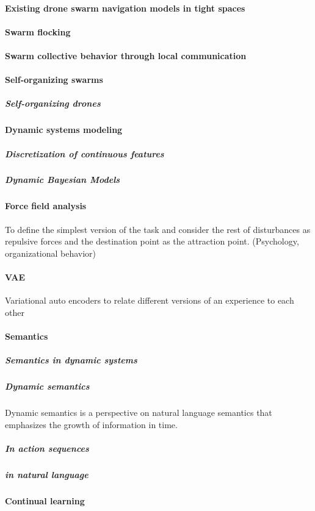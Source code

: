 \documentclass{article}
\begin{document}
		\paragraph{Existing drone swarm navigation models in tight spaces}
			\cite{soria-2020-swarmlab-a-matlab-drone-swarm-simulator}
		\paragraph{Swarm flocking}
			\cite{vasarhelyi-2014-outdoor-flocking-and-formation-flight-with-autonomous-aerial-robots}
			\cite{reynolds-1987-flocks-herds-and-schools-a-distributed-behavioral-model}
		\paragraph{Swarm collective behavior through local communication}
		\paragraph{Self-organizing swarms}
			\subparagraph{Self-organizing drones}
		\paragraph{Dynamic systems modeling}
			\subparagraph{Discretization of continuous features}
			\subparagraph{Dynamic Bayesian Models}
		\paragraph{Force field analysis} To define the simplest version of the task and consider the rest of disturbances as repulsive forces and the destination point as the attraction point. 
		(Psychology, organizational behavior)
		\paragraph{VAE} Variational auto encoders to relate different versions of an experience to each other
		\paragraph{Semantics}
			\subparagraph{Semantics in dynamic systems}	
			\subparagraph{Dynamic semantics} Dynamic semantics is a perspective on natural language semantics that emphasizes the growth of information in time. 	
			\subparagraph{In action sequences}
			\subparagraph{in natural language}
		\paragraph{Continual learning}
\end{document}

